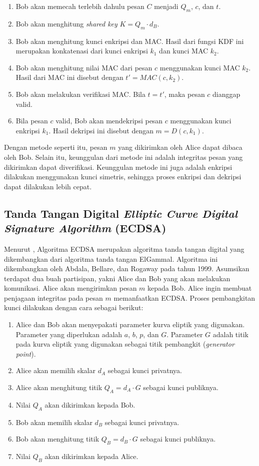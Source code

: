 \documentclass[conference]{IEEEtran}
\begin{document}
\begin{enumerate}
    \item Bob akan memecah terlebih dahulu pesan $C$ menjadi $Q_m$, $c$, dan $t$.
    \item Bob akan menghitung \emph{shared key} $K = Q_m \cdot d_B$.
    \item Bob akan menghitung kunci enkripsi dan MAC. Hasil dari fungsi KDF ini merupakan konkatenasi dari kunci enkripsi $k_1$ dan kunci MAC $k_2$.
    \item Bob akan menghitung nilai MAC dari pesan $c$ menggunakan kunci MAC $k_2$. Hasil dari MAC ini disebut dengan $t' = MAC(c, k_2)$.
    \item Bob akan melakukan verifikasi MAC. Bila $t = t'$, maka pesan $c$ dianggap valid.
    \item Bila pesan $c$ valid, Bob akan mendekripsi pesan $c$ menggunakan kunci enkripsi $k_1$. Hasil dekripsi ini disebut dengan $m = D(c, k_1)$.
\end{enumerate}

Dengan metode seperti itu, pesan $m$ yang dikirimkan oleh Alice dapat dibaca oleh Bob. Selain itu, keunggulan dari metode ini adalah integritas pesan yang dikirimkan dapat diverifikasi. Keunggulan metode ini juga adalah enkripsi dilakukan menggunakan kunci simetris, sehingga proses enkripsi dan dekripsi dapat dilakukan lebih cepat.

\subsection{Tanda Tangan Digital \emph{Elliptic Curve Digital Signature Algorithm} (ECDSA)}

Menurut \cite{b1}, Algoritma ECDSA merupakan algoritma tanda tangan digital yang dikembangkan dari algoritma tanda tangan ElGammal. Algoritma ini dikembangkan oleh Abdala, Bellare, dan Rogaway pada tahun 1999. Asumsikan terdapat dua buah partisipan, yakni Alice dan Bob yang akan melakukan komunikasi. Alice akan mengirimkan pesan $m$ kepada Bob. Alice ingin membuat penjagaan integritas pada pesan $m$ memanfaatkan ECDSA. Proses pembangkitan kunci dilakukan dengan cara sebagai berikut\cite{b2}:

\begin{enumerate}
    \item Alice dan Bob akan menyepakati parameter kurva eliptik yang digunakan. Parameter yang diperlukan adalah $a$, $b$, $p$, dan $G$. Parameter $G$ adalah titik pada kurva eliptik yang digunakan sebagai titik pembangkit (\emph{generator point}).
    \item Alice akan memilih skalar $d_A$ sebagai kunci privatnya.
    \item Alice akan menghitung titik $Q_A = d_A \cdot G$ sebagai kunci publiknya.
    \item Nilai $Q_A$ akan dikirimkan kepada Bob.
    \item Bob akan memilih skalar $d_B$ sebagai kunci privatnya.
    \item Bob akan menghitung titik $Q_B = d_B \cdot G$ sebagai kunci publiknya.
    \item Nilai $Q_B$ akan dikirimkan kepada Alice.
\end{enumerate}
\end{document}
